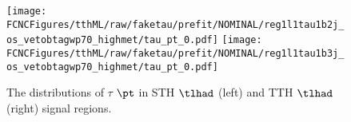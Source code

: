 \begin{figure}[H]
\centering
\texttt{[image: \\FCNCFigures/tthML/raw/faketau/prefit/NOMINAL/reg1l1tau1b2j\_os\_vetobtagwp70\_highmet/tau\_pt\_0.pdf]}
\texttt{[image: \\FCNCFigures/tthML/raw/faketau/prefit/NOMINAL/reg1l1tau1b3j\_os\_vetobtagwp70\_highmet/tau\_pt\_0.pdf]}

\caption{ The distributions of $\tau$ $\pt$ in STH $\tlhad$ (left) and TTH $\tlhad$ (right) signal regions. }
\label{fig:intro_pt_raw}
\end{figure}
